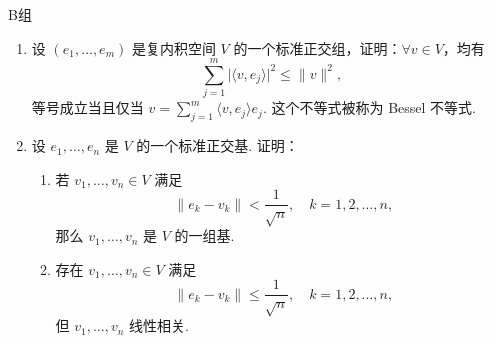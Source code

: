 \centerline{\heiti B组}
\begin{enumerate}
    \item 设 $ (e_1, \ldots , e_m) $ 是复内积空间 $ V $ 的一个标准正交组，证明：$ \forall v \in V $，均有
          \[ \sum_{j = 1}^{m} \lvert \langle v, e_j \rangle \rvert^2 \leqslant \lVert v \rVert^2, \]
          等号成立当且仅当 $ v = \displaystyle\sum_{j = 1}^{m} \langle v, e_j \rangle e_j $. 这个不等式被称为 Bessel 不等式.
    \item 设 $e_1, \ldots, e_n$ 是 $V$ 的一个标准正交基. 证明：
          \begin{enumerate}
              \item 若 $v_1, \ldots, v_n \in V$ 满足
                    \[
                        \lVert e_k - v_k \rVert < \dfrac{1}{\sqrt{n}}, \quad k = 1, 2, \ldots, n,
                    \]
                    那么 $v_1, \ldots, v_n$ 是 $V$ 的一组基.
              \item 存在 $v_1, \ldots, v_n \in V$ 满足
                    \[
                        \lVert e_k - v_k \rVert \leqslant \dfrac{1}{\sqrt{n}}, \quad k = 1, 2, \ldots, n,
                    \]
                    但 $v_1, \ldots, v_n$ 线性相关.
          \end{enumerate}
\end{enumerate}

